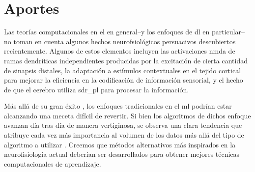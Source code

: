 




\section{Aportes}

Las teorías computacionales en el  en general--y los enfoques de \gls{dl} en particular--no toman en cuenta algunos hechos neurofsiológicos persuacivos descubiertos recientemente.
Algunos de estos elementos incluyen las activaciones \gls{nmda} de ramas dendríticas independientes producidas por la excitación de cierta cantidad de sinapsis distales, la adaptación a estímulos contextuales en el tejido cortical para mejorar la eficiencia en la codificación de información sensorial, y el hecho de que el cerebro utiliza \gls{sdr_pl} para procesar la información.

Más allá de su gran éxito \cite{lecun_deep_2015}, los enfoques tradicionales en el \gls{ml} podrían estar alcanzando una meceta difícil de revertir.
Si bien los algoritmos de dichos enfoque avanzan día tras día de manera vertiginosa, se observa una clara tendencia que atribuye cada vez más importancia al volumen de los datos más allá del tipo de algoritmo a utilizar \cite{PPR:PPR91722}.
Creemos que métodos alternativos más inspirados en la neurofisiología actual deberían ser desarrollados para obtener mejores técnicas computacionales de aprendizaje.

